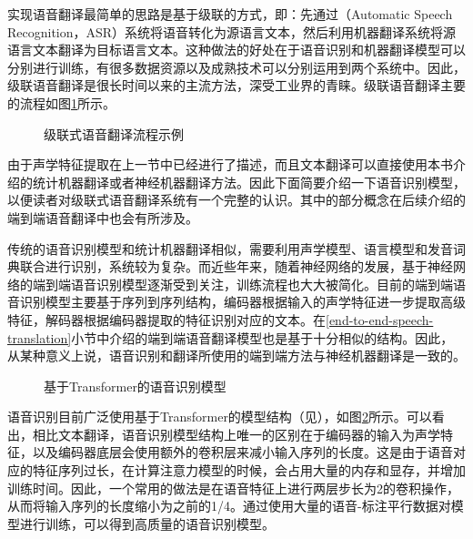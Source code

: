 \parinterval 实现语音翻译最简单的思路是基于级联的方式，即：先通过{\small{}}（Automatic Speech Recognition，ASR）系统将语音转化为源语言文本，然后利用机器翻译系统将源语言文本翻译为目标语言文本。这种做法的好处在于语音识别和机器翻译模型可以分别进行训练，有很多数据资源以及成熟技术可以分别运用到两个系统中。因此，级联语音翻译是很长时间以来的主流方法，深受工业界的青睐。级联语音翻译主要的流程如图\ref{fig:17-4}所示。

\begin{figure}[htp]
\centering

\caption{级联式语音翻译流程示例}
\label{fig:17-4}
\end{figure}

\parinterval 由于声学特征提取在上一节中已经进行了描述，而且文本翻译可以直接使用本书介绍的统计机器翻译或者神经机器翻译方法。因此下面简要介绍一下语音识别模型，以便读者对级联式语音翻译系统有一个完整的认识。其中的部分概念在后续介绍的端到端语音翻译中也会有所涉及。

\parinterval 传统的语音识别模型和统计机器翻译相似，需要利用声学模型、语言模型和发音词典联合进行识别，系统较为复杂。而近些年来，随着神经网络的发展，基于神经网络的端到端语音识别模型逐渐受到关注，训练流程也大大被简化。目前的端到端语音识别模型主要基于序列到序列结构，编码器根据输入的声学特征进一步提取高级特征，解码器根据编码器提取的特征识别对应的文本。在\ref{end-to-end-speech-translation}小节中介绍的端到端语音翻译模型也是基于十分相似的结构。因此，从某种意义上说，语音识别和翻译所使用的端到端方法与神经机器翻译是一致的。
\begin{figure}[htp]
\centering

\setlength{\abovecaptionskip}{-0.2em}
\caption{基于Transformer的语音识别模型}
\label{fig:17-5}
\end{figure}

\vspace{-1em}
\parinterval 语音识别目前广泛使用基于Transformer的模型结构（见{\chaptertwelve}），如图\ref{fig:17-5}所示。可以看出，相比文本翻译，语音识别模型结构上唯一的区别在于编码器的输入为声学特征，以及编码器底层会使用额外的卷积层来减小输入序列的长度。这是由于语音对应的特征序列过长，在计算注意力模型的时候，会占用大量的内存和显存，并增加训练时间。因此，一个常用的做法是在语音特征上进行两层步长为2的卷积操作，从而将输入序列的长度缩小为之前的1/4。通过使用大量的语音-标注平行数据对模型进行训练，可以得到高质量的语音识别模型。

